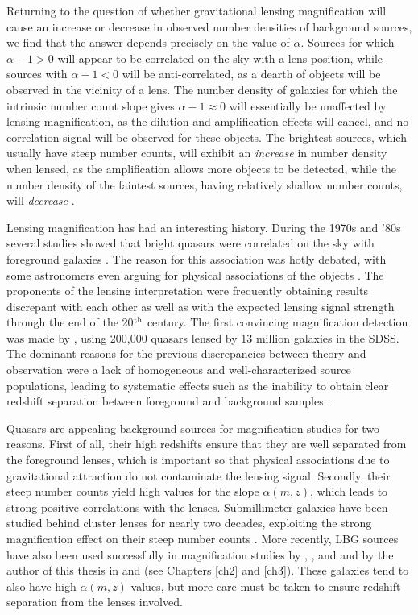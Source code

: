 Returning to the question of whether gravitational lensing magnification will cause an increase or decrease in observed number densities of background sources, we find that the answer depends precisely on the value of $\alpha$. Sources for which $\alpha -1 > 0$ will appear to be correlated on the sky with a lens position, while sources with $\alpha -1 < 0$ will be anti-correlated, as a dearth of objects will be observed in the vicinity of a lens.  The number density of galaxies for which the intrinsic number count slope gives $\alpha -1 \approx 0$ will essentially be unaffected by lensing magnification, as the dilution and amplification effects will cancel, and no correlation signal will be observed for these objects. The brightest sources, which usually have steep number counts, will exhibit an {\it increase} in number density when lensed, as the amplification allows more objects to be detected, while the number density of the faintest sources, having relatively shallow number counts, will {\it decrease} \citep{Narayan89,Scranton05}.

Lensing magnification has had an interesting history. During the 1970s and '80s several studies showed that bright quasars were correlated on the sky with foreground galaxies \citep{SeldnerPeebles79,Arp81,Webster88,Narayan89}. The reason for this association was hotly debated, with some astronomers even arguing for physical associations of the objects \citep[e.g.][]{Arp87}. The proponents of the lensing interpretation were frequently obtaining results discrepant with each other as well as with the expected lensing signal strength \citep[see e.g.][]{Schneider92} through the end of the 20$^{\rm th}$ century. The first convincing magnification detection was made by \citet{Scranton05}, using 200,000 quasars lensed by 13 million galaxies in the \acf{SDSS}. The dominant reasons for the previous discrepancies between theory and observation were a lack of homogeneous and well-characterized source populations, leading to systematic effects such as the inability to obtain clear redshift separation between foreground and background samples \citep{Scranton05}.

Quasars are appealing background sources for magnification studies for two reasons. First of all, their high redshifts ensure that they are well separated from the foreground lenses, which is important so that physical associations due to gravitational attraction do not contaminate the lensing signal. Secondly, their steep number counts yield high values for the slope $\alpha(m,z)$, which leads to strong positive correlations with the lenses. Submillimeter galaxies have been studied behind cluster lenses for nearly two decades, exploiting the strong magnification effect on their steep number counts \citep{Blain96,Smail97}. More recently, \acf{LBG} sources have also been used successfully in magnification studies by \citet{Hildebrandt09b}, \citet{Morrison12}, and \citet{Hildebrandt13} and by the author of this thesis in \citet{Ford12} and \citet{Ford14} (see Chapters \ref{ch2} and \ref{ch3}). These galaxies tend to also have high $\alpha(m,z)$ values, but more care must be taken to ensure redshift separation from the lenses involved.

